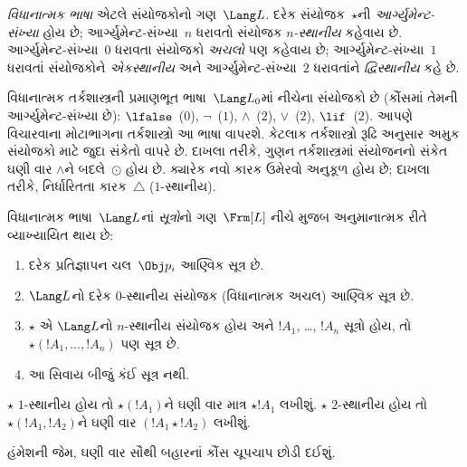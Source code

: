 \begin{defn}
  \emph{વિધાનાત્મક ભાષા} એટલે સંયોજકોનો ગણ~$\Lang L$.
  દરેક સંયોજક~$\star$ની \emph{આર્ગ્યુમેન્ટ-સંખ્યા}
  હોય છે; આર્ગ્યુમેન્ટ-સંખ્યા~$n$ ધરાવતો સંયોજક
  \emph{$n$-સ્થાનીય} કહેવાય છે. આર્ગ્યુમેન્ટ-સંખ્યા~$0$
  ધરાવતા સંયોજકો \emph{અચલો} પણ કહેવાય છે;
  આર્ગ્યુમેન્ટ-સંખ્યા~$1$ ધરાવતાં સંયોજકોને
  \emph{એકસ્થાનીય} અને આર્ગ્યુમેન્ટ-સંખ્યા~$2$
  ધરાવતાંને \emph{દ્વિસ્થાનીય} કહે છે.
\end{defn}

\begin{ex}
  વિધાનાત્મક તર્કશાસ્ત્રની પ્રમાણભૂત ભાષા~$\Lang L_0$માં
  નીચેના સંયોજકો છે (કૌંસમાં તેમની આર્ગ્યુમેન્ટ-સંખ્યા છે):
  $\lfalse$~($0$),
  $\lnot$~($1$),
  $\land$~($2$),
  $\lor$~($2$),
  $\lif$~($2$). આપણે વિચારવાના મોટાભાગના
  તર્કશાસ્ત્રો આ ભાષા વાપરશે. કેટલાક તર્કશાસ્ત્રો
  રૂઢિ અનુસાર અમુક સંયોજકો માટે જુદા સંકેતો
  વાપરે છે. દાખલા તરીકે, ગુણન તર્કશાસ્ત્રમાં
  સંયોજનનો સંકેત ઘણી વાર $\land$ને બદલે~$\odot$
  હોય છે. ક્યારેક નવો કારક ઉમેરવો અનુકૂળ હોય છે;
  દાખલા તરીકે, નિર્ધારિતતા કારક~$\triangle$
  ($1$-સ્થાનીય).
\end{ex}
\endgroup


\begingroup
\makeatletter{}\makeatother


\label{guunit:OLP-0387}


\begin{defn}[સૂત્ર]
વિધાનાત્મક ભાષા~$\Lang L$નાં \emph{સૂત્રો}નો
ગણ~$\Frm[L]$ નીચે મુજબ અનુમાનાત્મક રીતે વ્યાખ્યાયિત થાય છે:
\begin{enumerate}
\item દરેક પ્રતિજ્ઞાપન ચલ~$\Obj p_i$ આણ્વિક
  સૂત્ર છે.
\item $\Lang L$નો દરેક $0$-સ્થાનીય સંયોજક
  (વિધાનાત્મક અચલ) આણ્વિક સૂત્ર છે.
\item $\star$ એ $\Lang L$નો $n$-સ્થાનીય સંયોજક
  હોય અને $!A_1$, \dots, $!A_n$ સૂત્રો હોય,
  તો $\star(!A_1, \dots, !A_n)$ પણ સૂત્ર છે.
\item આ સિવાય બીજું કંઈ સૂત્ર નથી.
\end{enumerate}
$\star$ $1$-સ્થાનીય હોય તો $\star(!A_1)$ને ઘણી વાર
માત્ર $\star !A_1$ લખીશું. $\star$ $2$-સ્થાનીય હોય તો
$\star(!A_1,!A_2)$ને ઘણી વાર $(!A_1 \star !A_2)$
લખીશું.
\end{defn}

હંમેશની જેમ, ઘણી વાર સૌથી બહારનાં કૌંસ ચૂપચાપ
છોડી દઈશું.

